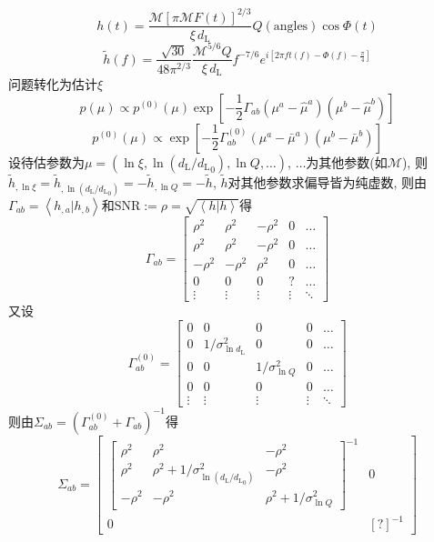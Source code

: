 \cite{Poisson1995}
\begin{equation}
    h(t)=\frac{\mathcal{M}[\pi \mathcal{M}F(t)]^{2/3}}{\xi\,d_\text{L}}Q(\text{angles})\cos\Phi(t)
\end{equation}
\begin{equation}
    \tilde{h}(f)=\frac{\sqrt{30}}{48\pi^{2/3}}\frac{\mathcal{M}^{5/6}Q}{\xi\,d_\text{L}}f^{-7/6}e^{i[2\pi ft(f)-\Phi(f)-\frac{\pi}{4}]}
\end{equation}
问题转化为估计$\xi$
\begin{equation}
    p(\mu)\propto p^{(0)}(\mu)\exp[
        -\frac{1}{2}\Gamma_{ab}(\mu^a-\hat{\mu}^a)(\mu^b-\hat{\mu}^b)
    ]
\end{equation}
\begin{equation}
    p^{(0)}(\mu)\propto\exp[
        -\frac{1}{2}\Gamma^{(0)}_{ab}(\mu^a-\bar{\mu}^a)(\mu^b-\bar{\mu}^b)
    ]
\end{equation}
设待估参数为$\mu=(\ln\xi,\ln (d_\text{L}/{d_\text{L}}_0),\ln Q,\dots)$, $\dots$为其他参数(如$\mathcal{M}$), 则$\tilde{h}_{,\ln\xi}=\tilde{h}_{,\ln (d_\text{L}/{d_\text{L}}_0)}=-\tilde{h}_{,\ln Q}=-\tilde{h}$, $\tilde{h}$对其他参数求偏导皆为纯虚数, 则由$\Gamma_{ab}=\left\langle h_{,a}|h_{,b}\right\rangle $和$\text{SNR}:=\rho=\sqrt{\left\langle h|h\right\rangle}$得
\begin{equation}
    \Gamma_{ab}=\begin{bmatrix}
        \rho^2&\rho^2&-\rho^2&0&\dots\\
        \rho^2&\rho^2&-\rho^2&0&\dots\\
        -\rho^2&-\rho^2&\rho^2&0&\dots\\
        0&0&0&?&\ldots\\
        \vdots&\vdots&\vdots&\vdots&\ddots 
    \end{bmatrix}
\end{equation}
又设
\begin{equation}
    \Gamma^{(0)}_{ab}=\begin{bmatrix}
        0&0&0&0&\dots\\
        0&1/\sigma_{\ln d_\text{L}}^2&0&0&\dots\\
        0&0&1/\sigma_{\ln Q}^2&0&\dots\\
        0 &0&0&0&\ldots\\
        \vdots&\vdots&\vdots&\vdots&\ddots 
    \end{bmatrix}
\end{equation}
则由$\Sigma_{ab}=(\Gamma^{(0)}_{ab}+\Gamma_{ab})^{-1}$得
\begin{equation}
    \Sigma_{ab}=\begin{bmatrix}
        \begin{bmatrix}
            \rho^2&\rho^2&-\rho^2\\
            \rho^2&\rho^2+1/\sigma_{\ln (d_\text{L}/{d_\text{L}}_0)}^2&-\rho^2\\
            -\rho^2&-\rho^2&\rho^2+1/\sigma_{\ln Q}^2
        \end{bmatrix}^{-1}&0\\
        0&[?]^{-1}
    \end{bmatrix}
\end{equation}
